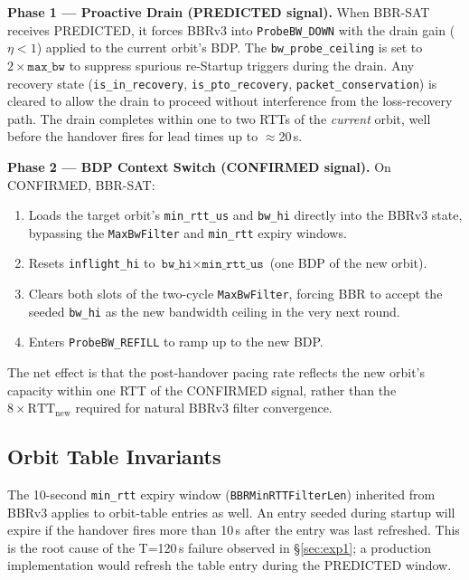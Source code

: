 \documentclass[conference]{IEEEtran}
\begin{document}
\textbf{Phase 1 --- Proactive Drain (PREDICTED signal).}
When BBR-SAT receives PREDICTED, it forces BBRv3 into
\texttt{ProbeBW\_DOWN} with the drain gain ($\eta < 1$) applied to the
current orbit's BDP.
The \texttt{bw\_probe\_ceiling} is set to $2 \times \texttt{max\_bw}$ to
suppress spurious re-Startup triggers during the drain.
Any recovery state (\texttt{is\_in\_recovery}, \texttt{is\_pto\_recovery},
\texttt{packet\_conservation}) is cleared to allow the drain to proceed
without interference from the loss-recovery path.
The drain completes within one to two RTTs of the \emph{current} orbit,
well before the handover fires for lead times up to $\approx$20\,s.

\textbf{Phase 2 --- BDP Context Switch (CONFIRMED signal).}
On CONFIRMED, BBR-SAT:
\begin{enumerate}
  \item Loads the target orbit's \texttt{min\_rtt\_us} and \texttt{bw\_hi}
        directly into the BBRv3 state, bypassing the
        \texttt{MaxBwFilter} and \texttt{min\_rtt} expiry windows.
  \item Resets \texttt{inflight\_hi} to
        $\texttt{bw\_hi} \times \texttt{min\_rtt\_us}$
        (one BDP of the new orbit).
  \item Clears both slots of the two-cycle \texttt{MaxBwFilter},
        forcing BBR to accept the seeded \texttt{bw\_hi} as the new
        bandwidth ceiling in the very next round.
  \item Enters \texttt{ProbeBW\_REFILL} to ramp up to the new BDP.
\end{enumerate}

The net effect is that the post-handover pacing rate reflects the new
orbit's capacity within one RTT of the CONFIRMED signal, rather than
the $8 \times \mathrm{RTT}_\mathrm{new}$ required for natural BBRv3
filter convergence.

\subsection{Orbit Table Invariants}

The 10-second \texttt{min\_rtt} expiry window (\texttt{BBRMinRTTFilterLen})
inherited from BBRv3 applies to orbit-table entries as well.
An entry seeded during startup will expire if the handover fires more
than 10\,s after the entry was last refreshed.
This is the root cause of the T=120\,s failure observed in
\S\ref{sec:exp1}; a production implementation would refresh the table
entry during the PREDICTED window.
\end{document}

